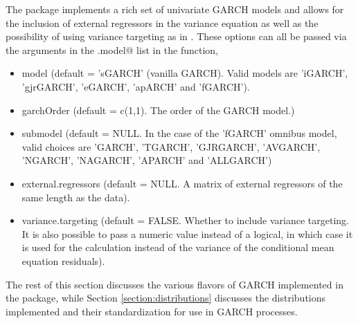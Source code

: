 The \verb@rugarch@ package implements a rich set of univariate GARCH models and
allows for the inclusion of external regressors in the variance equation as well
as the possibility of using variance targeting as in \cite{Engle1995a}.
These options can all be passed via the arguments in the \verb@variance.model@
list in the \verb@ugarchspec@ function,
\begin{itemize}
\item model			(default = 'sGARCH' (vanilla GARCH).
Valid models are 'iGARCH', 'gjrGARCH', 'eGARCH', 'apARCH' and 'fGARCH').
\item garchOrder	(default = c(1,1).  The order of the GARCH model.)
\item submodel  	(default = NULL. In the case of the 'fGARCH'
omnibus model, valid choices are 'GARCH', 'TGARCH', 'GJRGARCH', 'AVGARCH',
'NGARCH', 'NAGARCH', 'APARCH' and 'ALLGARCH')
\item external.regressors (default = NULL. A matrix of external regressors of
the same length as the data).
\item variance.targeting  (default = FALSE. Whether to include variance
targeting. It is also possible to pass a numeric value instead of a logical, in which case it
is used for the calculation instead of the variance of the conditional mean equation residuals).
\end{itemize}
The rest of this section discusses the various flavors of GARCH implemented in
the package, while  Section \ref{section:distributions} discusses the
distributions implemented and their standardization for use in GARCH processes.

